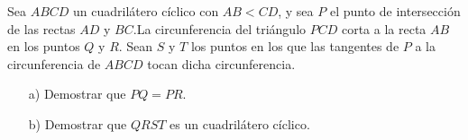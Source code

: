 Sea $ABCD$ un cuadrilátero cíclico con $AB<CD$, y sea $P$ el punto de intersección de las rectas $AD$ y $BC$.La circunferencia del triángulo $PCD$ corta a la recta $AB$ en los puntos $Q$ y $R$. Sean $S$ y $T$ los puntos en los que las tangentes de $P$ a la circunferencia de $ABCD$ tocan dicha circunferencia.
\begin{enumerate}
  \item[a)] Demostrar que $PQ=PR$.
  \item[b)] Demostrar que $QRST$ es un cuadrilátero cíclico.
\end{enumerate}
